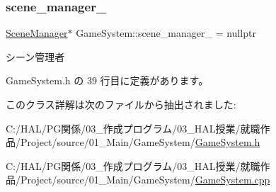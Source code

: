 \subsubsection{\texorpdfstring{scene\+\_\+manager\+\_\+}{scene\_manager\_}}
{\footnotesize\ttfamily \mbox{\hyperlink{class_scene_manager}{Scene\+Manager}}$\ast$ Game\+System\+::scene\+\_\+manager\+\_\+ = nullptr\hspace{0.3cm}{\ttfamily [private]}}



シーン管理者 



 Game\+System.\+h の 39 行目に定義があります。



このクラス詳解は次のファイルから抽出されました\+:\begin{DoxyCompactItemize}
\item 
C\+:/\+H\+A\+L/\+P\+G関係/03\+\_\+作成プログラム/03\+\_\+\+H\+A\+L授業/就職作品/\+Project/source/01\+\_\+\+Main/\+Game\+System/\mbox{\hyperlink{_game_system_8h}{Game\+System.\+h}}\item 
C\+:/\+H\+A\+L/\+P\+G関係/03\+\_\+作成プログラム/03\+\_\+\+H\+A\+L授業/就職作品/\+Project/source/01\+\_\+\+Main/\+Game\+System/\mbox{\hyperlink{_game_system_8cpp}{Game\+System.\+cpp}}\end{DoxyCompactItemize}
